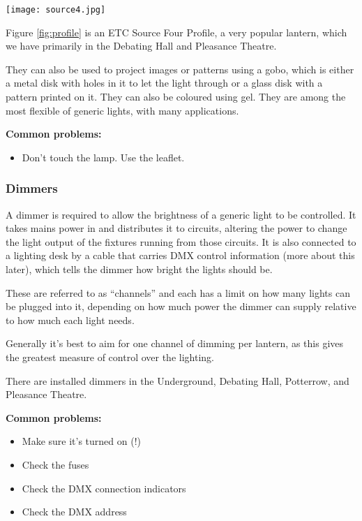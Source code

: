 \documentclass[14pt]{article} %
\let\Oldsubsubsection\subsubsection
\renewcommand{\subsubsection}{\FloatBarrier\Oldsubsubsection}
\begin{document}
\begin{itemize}
\begin{figure*}[h]
\begin{center}

\texttt{[image: source4.jpg]}
\caption{Source 4 Profile}
\label{fig:profile}

\end{center}
\end{figure*}

Figure \ref{fig:profile} is an ETC Source Four Profile, a very popular lantern, which we have primarily in the Debating Hall and Pleasance Theatre.

They can also be used to project images or patterns using a gobo, which is either a metal disk with holes in it to let the light through or a glass disk with a pattern printed on it. They can also be coloured using gel. They are among the most flexible of generic lights, with many applications. 

\textbf{Common problems:}
\begin{itemize}
\item Don't touch the lamp. Use the leaflet.
\end{itemize}

\end{itemize}

\subsubsection{Dimmers}
A dimmer is required to allow the brightness of a generic light to be controlled. It takes mains power in and distributes it to circuits, altering the power to change the light output of the fixtures running from those circuits. It is also connected to a lighting desk by a cable that carries DMX control information (more about this later), which tells the dimmer how bright the lights should be. 

These are referred to as “channels” and each has a limit on how many lights can be plugged into it, depending on how much power the dimmer can supply relative to how much each light needs.

Generally it’s best to aim for one channel of dimming per lantern, as this gives the greatest measure of control over the lighting.

There are installed dimmers in the Underground, Debating Hall, Potterrow, and Pleasance Theatre.

\textbf{Common problems:}
\begin{itemize}
\item	Make sure it’s turned on (!)
\item	Check the fuses
\item	Check the DMX connection indicators
\item	Check the DMX address
\end{itemize}
\end{document}
